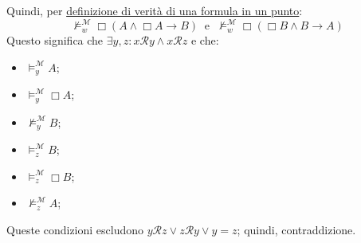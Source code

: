 \documentclass[a4paper,12pt]{article}
\begin{document}
\begin{dimo}
\begin{enumerate}
		Quindi, per \hyperlink{defverp}{definizione di verità di una formula in un punto}:
		$$\nvDash_w^{\mathcal{M}} \Box(A \land \Box A \to B) \;\; \text{e} \;\; \nvDash_w^{\mathcal{M}} \Box (\Box B \land B \to A)$$
		Questo significa che $\exists y, z : x\mathcal{R}y \land x\mathcal{R}z$ e che:
		\begin{itemize}
			\item $\vDash_y^{\mathcal{M}} A$;
			\item $\vDash_y^{\mathcal{M}} \Box A$;
			\item $\nvDash_y^{\mathcal{M}} B$;
			\item $\vDash_z^{\mathcal{M}} B$;
			\item $\vDash_z^{\mathcal{M}} \Box B$;
			\item $\nvDash_z^{\mathcal{M}} A$;
		\end{itemize}
		Queste condizioni escludono $y\mathcal{R}z \lor z\mathcal{R}y \lor y=z$; quindi,  contraddizione. 
	\end{enumerate}
\end{dimo}
\end{document}
